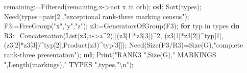 \documentclass[
  11pt,
  a4paper,
]{article}
\newenvironment{Shaded}{}{}
\newcommand{\BuiltInTok}[1]{\textcolor[rgb]{0.00,0.50,0.00}{#1}}
\newcommand{\ConstantTok}[1]{\textcolor[rgb]{0.53,0.00,0.00}{#1}}
\newcommand{\ControlFlowTok}[1]{\textcolor[rgb]{0.00,0.44,0.13}{\textbf{#1}}}
\newcommand{\ExtensionTok}[1]{#1}
\newcommand{\FloatTok}[1]{\textcolor[rgb]{0.25,0.63,0.44}{#1}}
\newcommand{\NormalTok}[1]{#1}
\newcommand{\OperatorTok}[1]{\textcolor[rgb]{0.40,0.40,0.40}{#1}}
\newcommand{\StringTok}[1]{\textcolor[rgb]{0.25,0.44,0.63}{#1}}
\newcommand{\VariableTok}[1]{\textcolor[rgb]{0.10,0.09,0.49}{#1}}
\begin{document}
\begin{Shaded}
\begin{Highlighting}[]
    \VariableTok{remaining}\OperatorTok{:=}\BuiltInTok{Filtered}\NormalTok{(}\VariableTok{remaining}\OperatorTok{,}\VariableTok{x}\OperatorTok{{-}\textgreater{}}\ConstantTok{not} \VariableTok{x} \ExtensionTok{in} \VariableTok{orb}\NormalTok{)}\OperatorTok{;}
  \ControlFlowTok{od}\OperatorTok{;}
  \BuiltInTok{Sort}\NormalTok{(}\VariableTok{types}\NormalTok{)}\OperatorTok{;} \VariableTok{Need}\NormalTok{(}\VariableTok{types}\OperatorTok{=}\VariableTok{pair}\NormalTok{[}\FloatTok{2}\NormalTok{]}\OperatorTok{,}\StringTok{"exceptional rank{-}three marking census"}\NormalTok{)}\OperatorTok{;}
  \VariableTok{F3}\OperatorTok{:=}\BuiltInTok{FreeGroup}\NormalTok{(}\StringTok{"x"}\OperatorTok{,}\StringTok{"y"}\OperatorTok{,}\StringTok{"z"}\NormalTok{)}\OperatorTok{;} \VariableTok{z3}\OperatorTok{:=}\BuiltInTok{GeneratorsOfGroup}\NormalTok{(}\VariableTok{F3}\NormalTok{)}\OperatorTok{;}
  \ControlFlowTok{for} \VariableTok{typ} \ExtensionTok{in} \VariableTok{types} \ControlFlowTok{do}
    \VariableTok{R3}\OperatorTok{:=}\BuiltInTok{Concatenation}\NormalTok{(}\BuiltInTok{List}\NormalTok{(}\VariableTok{z3}\OperatorTok{,}\VariableTok{a}\OperatorTok{{-}\textgreater{}}\VariableTok{a}\OperatorTok{\^{}}\FloatTok{2}\NormalTok{)}\OperatorTok{,}\NormalTok{[(}\VariableTok{z3}\NormalTok{[}\FloatTok{1}\NormalTok{]}\OperatorTok{*}\VariableTok{z3}\NormalTok{[}\FloatTok{3}\NormalTok{])}\OperatorTok{\^{}}\FloatTok{2}\OperatorTok{,}
\NormalTok{      (}\VariableTok{z3}\NormalTok{[}\FloatTok{1}\NormalTok{]}\OperatorTok{*}\VariableTok{z3}\NormalTok{[}\FloatTok{2}\NormalTok{])}\OperatorTok{\^{}}\VariableTok{typ}\NormalTok{[}\FloatTok{1}\NormalTok{]}\OperatorTok{,}\NormalTok{(}\VariableTok{z3}\NormalTok{[}\FloatTok{2}\NormalTok{]}\OperatorTok{*}\VariableTok{z3}\NormalTok{[}\FloatTok{3}\NormalTok{])}\OperatorTok{\^{}}\VariableTok{typ}\NormalTok{[}\FloatTok{2}\NormalTok{]}\OperatorTok{,}\BuiltInTok{Product}\NormalTok{(}\VariableTok{z3}\NormalTok{)}\OperatorTok{\^{}}\VariableTok{typ}\NormalTok{[}\FloatTok{3}\NormalTok{]])}\OperatorTok{;}
    \VariableTok{Need}\NormalTok{(}\BuiltInTok{Size}\NormalTok{(}\VariableTok{F3}\OperatorTok{/}\VariableTok{R3}\NormalTok{)}\OperatorTok{=}\BuiltInTok{Size}\NormalTok{(}\VariableTok{G}\NormalTok{)}\OperatorTok{,}\StringTok{"complete rank{-}three presentation"}\NormalTok{)}\OperatorTok{;}
  \ControlFlowTok{od}\OperatorTok{;}
  \BuiltInTok{Print}\NormalTok{(}\StringTok{"RANK3 "}\OperatorTok{,}\BuiltInTok{Size}\NormalTok{(}\VariableTok{G}\NormalTok{)}\OperatorTok{,}\StringTok{" MARKINGS "}\OperatorTok{,}\BuiltInTok{Length}\NormalTok{(}\VariableTok{markings}\NormalTok{)}\OperatorTok{,}\StringTok{" TYPES "}\OperatorTok{,}\VariableTok{types}\OperatorTok{,}\StringTok{"\textbackslash{}n"}\NormalTok{)}\OperatorTok{;}

\end{Highlighting}
\end{Shaded}
\end{document}
